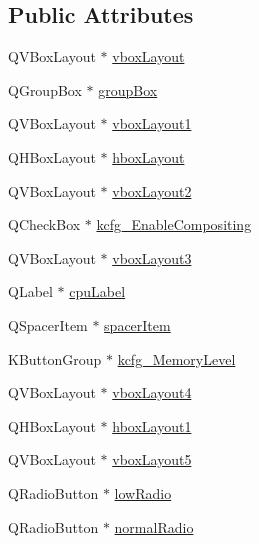 \subsection*{Public Attributes}
\begin{DoxyCompactItemize}
\item 
Q\+V\+Box\+Layout $\ast$ \hyperlink{classUi__DlgPerformanceBase_abae379ebe3e2f77707d6621ce00a7236}{vbox\+Layout}
\item 
Q\+Group\+Box $\ast$ \hyperlink{classUi__DlgPerformanceBase_a95446d4eb7ed6bca1d9ab130459e2026}{group\+Box}
\item 
Q\+V\+Box\+Layout $\ast$ \hyperlink{classUi__DlgPerformanceBase_a39bb4caf4acbc4131727a12ec7bff223}{vbox\+Layout1}
\item 
Q\+H\+Box\+Layout $\ast$ \hyperlink{classUi__DlgPerformanceBase_af14f550725818437cba053b3da16ef8a}{hbox\+Layout}
\item 
Q\+V\+Box\+Layout $\ast$ \hyperlink{classUi__DlgPerformanceBase_a7daf9953a4d7a2ceebaac14b9e556d40}{vbox\+Layout2}
\item 
Q\+Check\+Box $\ast$ \hyperlink{classUi__DlgPerformanceBase_a0a5b7fdc59983df4f9a1cae459eaa783}{kcfg\+\_\+\+Enable\+Compositing}
\item 
Q\+V\+Box\+Layout $\ast$ \hyperlink{classUi__DlgPerformanceBase_a353ef6aa2acdcffede6a00356a036484}{vbox\+Layout3}
\item 
Q\+Label $\ast$ \hyperlink{classUi__DlgPerformanceBase_add0831b3efdd1175e047cbffe44f0f8d}{cpu\+Label}
\item 
Q\+Spacer\+Item $\ast$ \hyperlink{classUi__DlgPerformanceBase_acea1ae89922e962a9197eb648f0459ae}{spacer\+Item}
\item 
K\+Button\+Group $\ast$ \hyperlink{classUi__DlgPerformanceBase_a93edac845d7c5b17eb8daf50d97d0e3f}{kcfg\+\_\+\+Memory\+Level}
\item 
Q\+V\+Box\+Layout $\ast$ \hyperlink{classUi__DlgPerformanceBase_a8cc54ee3f49d72f579529a8c662a83d7}{vbox\+Layout4}
\item 
Q\+H\+Box\+Layout $\ast$ \hyperlink{classUi__DlgPerformanceBase_ade0a3a0e7bb84cff157c402871c86973}{hbox\+Layout1}
\item 
Q\+V\+Box\+Layout $\ast$ \hyperlink{classUi__DlgPerformanceBase_aca07571304c349fac4fe04a617341403}{vbox\+Layout5}
\item 
Q\+Radio\+Button $\ast$ \hyperlink{classUi__DlgPerformanceBase_a061da5609688bcfe645b49acad1a34bc}{low\+Radio}
\item 
Q\+Radio\+Button $\ast$ \hyperlink{classUi__DlgPerformanceBase_a3fcb5b781285ca6f62db48988f9ea3a9}{normal\+Radio}

\end{DoxyCompactItemize}
